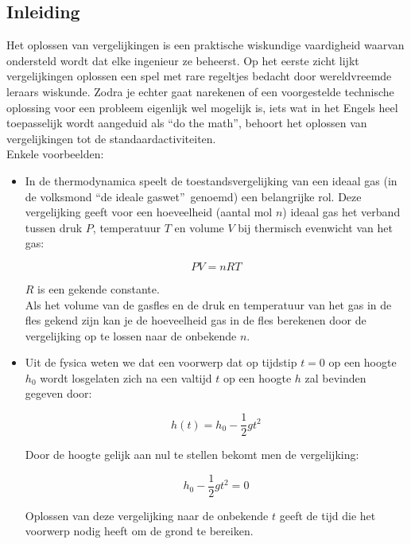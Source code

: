 \subsection*{Inleiding}

Het oplossen van vergelijkingen is een praktische wiskundige vaardigheid waarvan ondersteld wordt dat elke ingenieur ze beheerst. Op het eerste zicht lijkt vergelijkingen oplossen een spel met rare  regeltjes bedacht door wereldvreemde leraars wiskunde. Zodra je echter gaat narekenen of een voorgestelde technische oplossing voor een probleem eigenlijk wel mogelijk is, iets wat in het Engels heel toepasselijk wordt aangeduid als \textquotedblleft do the math\textquotedblright, behoort het oplossen van vergelijkingen tot de standaardactiviteiten.\\

Enkele voorbeelden:

\begin{itemize}

\item {In de thermodynamica speelt de toestandsvergelijking van een ideaal gas (in de volksmond \textquotedblleft de ideale gaswet\textquotedblright\ genoemd) een belangrijke rol. Deze vergelijking geeft voor een hoeveelheid (aantal mol $n$) ideaal gas het verband tussen druk $P$, temperatuur $T$ en volume $V$ bij thermisch evenwicht van het gas:

\[ PV=nRT \]

$R$ is een gekende constante.\\
Als het volume van de gasfles en de druk en temperatuur van het gas in de fles gekend zijn kan je de hoeveelheid gas in de fles berekenen door de vergelijking op te lossen naar de onbekende $n$.}

\item {Uit de fysica weten we dat een voorwerp dat op tijdstip $t=0$ op een hoogte $h_{0}$ wordt losgelaten zich na een valtijd $t$ op een hoogte $h$ zal bevinden gegeven door:

    \[ h(t)=h_{0}-\frac{1}{2}gt^2 \]

    Door de hoogte gelijk aan nul te stellen bekomt men de vergelijking:

    \[ h_{0}-\frac{1}{2}gt^2 =0 \]

    Oplossen van deze vergelijking naar de onbekende $t$ geeft de tijd die het voorwerp nodig heeft om de grond te bereiken.}

    \end{itemize}


